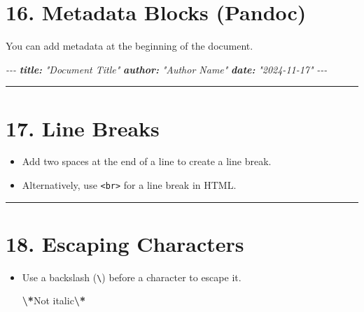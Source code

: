 \documentclass[
]{book}
\newenvironment{Shaded}{\begin{snugshade}}{\end{snugshade}}
\newcommand{\AnnotationTok}[1]{\textcolor[rgb]{0.56,0.35,0.01}{\textbf{\textit{#1}}}}
\newcommand{\CommentTok}[1]{\textcolor[rgb]{0.56,0.35,0.01}{\textit{#1}}}
\newcommand{\NormalTok}[1]{#1}
\newcommand{\SpecialCharTok}[1]{\textcolor[rgb]{0.81,0.36,0.00}{\textbf{#1}}}
\providecommand{\tightlist}{%
  \setlength{\itemsep}{0pt}\setlength{\parskip}{0pt}}
\theoremstyle{definition}
\theoremstyle{definition}
\theoremstyle{definition}
\theoremstyle{definition}
\theoremstyle{remark}
\begin{document}
\section{16. Metadata Blocks (Pandoc)}\label{metadata-blocks-pandoc}

You can add metadata at the beginning of the document.

\begin{Shaded}
\begin{Highlighting}[]
\CommentTok{{-}{-}{-}}
\AnnotationTok{title:}\CommentTok{ "Document Title"}
\AnnotationTok{author:}\CommentTok{ "Author Name"}
\AnnotationTok{date:}\CommentTok{ "2024{-}11{-}17"}
\CommentTok{{-}{-}{-}}
\end{Highlighting}
\end{Shaded}

\begin{center}\rule{0.5\linewidth}{0.5pt}\end{center}

\section{17. Line Breaks}\label{line-breaks}

\begin{itemize}
\tightlist
\item
  Add two spaces at the end of a line to create a line break.
\item
  Alternatively, use \texttt{\textless{}br\textgreater{}} for a line break in HTML.
\end{itemize}

\begin{center}\rule{0.5\linewidth}{0.5pt}\end{center}

\section{18. Escaping Characters}\label{escaping-characters}

\begin{itemize}
\item
  Use a backslash (\texttt{\textbackslash{}}) before a character to escape it.

\begin{Shaded}
\begin{Highlighting}[]
\SpecialCharTok{\textbackslash{}*}\NormalTok{Not italic}\SpecialCharTok{\textbackslash{}*}
\end{Highlighting}
\end{Shaded}
\end{itemize}
\end{document}
